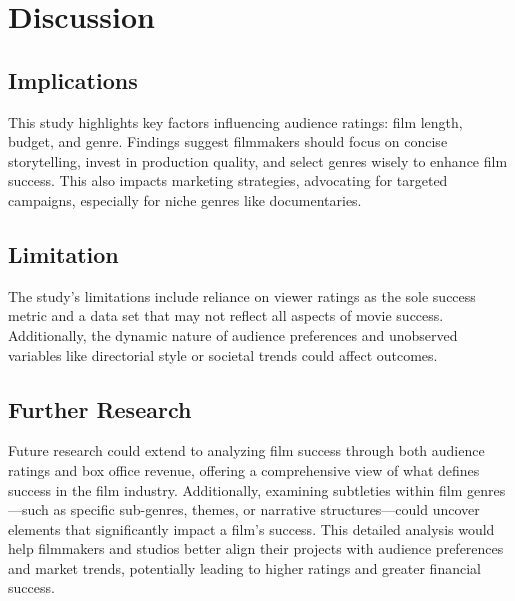 \documentclass[
  11pt,
]{article}
\begin{document}
\hypertarget{discussion}{%
\section{Discussion}\label{discussion}}

\hypertarget{implications}{%
\subsection{Implications}\label{implications}}

This study highlights key factors influencing audience ratings: film
length, budget, and genre. Findings suggest filmmakers should focus on
concise storytelling, invest in production quality, and select genres
wisely to enhance film success. This also impacts marketing strategies,
advocating for targeted campaigns, especially for niche genres like
documentaries.

\hypertarget{limitation}{%
\subsection{Limitation}\label{limitation}}

The study's limitations include reliance on viewer ratings as the sole
success metric and a data set that may not reflect all aspects of movie
success. Additionally, the dynamic nature of audience preferences and
unobserved variables like directorial style or societal trends could
affect outcomes.

\hypertarget{further-research}{%
\subsection{Further Research}\label{further-research}}

Future research could extend to analyzing film success through both
audience ratings and box office revenue, offering a comprehensive view
of what defines success in the film industry. Additionally, examining
subtleties within film genres---such as specific sub-genres, themes, or
narrative structures---could uncover elements that significantly impact
a film's success. This detailed analysis would help filmmakers and
studios better align their projects with audience preferences and market
trends, potentially leading to higher ratings and greater financial
success.
\end{document}
